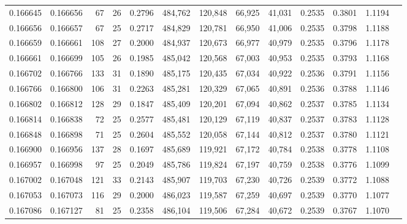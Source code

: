 \begin{tabular}{rrrrrrrrrrrrr}
0.166645 & 0.166656 &    67 &  26 &                                     0.2796 & 484,762 & 120,848 &  66,925 &  41,031 & 0.2535 & 0.3801 & 1.1194 \\
0.166656 & 0.166657 &    67 &  25 &                                     0.2717 & 484,829 & 120,781 &  66,950 &  41,006 & 0.2535 & 0.3798 & 1.1188 \\
0.166659 & 0.166661 &   108 &  27 &                                     0.2000 & 484,937 & 120,673 &  66,977 &  40,979 & 0.2535 & 0.3796 & 1.1178 \\
0.166661 & 0.166699 &   105 &  26 &                                     0.1985 & 485,042 & 120,568 &  67,003 &  40,953 & 0.2535 & 0.3793 & 1.1168 \\
0.166702 & 0.166766 &   133 &  31 &                                     0.1890 & 485,175 & 120,435 &  67,034 &  40,922 & 0.2536 & 0.3791 & 1.1156 \\
0.166766 & 0.166800 &   106 &  31 &                                     0.2263 & 485,281 & 120,329 &  67,065 &  40,891 & 0.2536 & 0.3788 & 1.1146 \\
0.166802 & 0.166812 &   128 &  29 &                                     0.1847 & 485,409 & 120,201 &  67,094 &  40,862 & 0.2537 & 0.3785 & 1.1134 \\
0.166814 & 0.166838 &    72 &  25 &                                     0.2577 & 485,481 & 120,129 &  67,119 &  40,837 & 0.2537 & 0.3783 & 1.1128 \\
0.166848 & 0.166898 &    71 &  25 &                                     0.2604 & 485,552 & 120,058 &  67,144 &  40,812 & 0.2537 & 0.3780 & 1.1121 \\
0.166900 & 0.166956 &   137 &  28 &                                     0.1697 & 485,689 & 119,921 &  67,172 &  40,784 & 0.2538 & 0.3778 & 1.1108 \\
0.166957 & 0.166998 &    97 &  25 &                                     0.2049 & 485,786 & 119,824 &  67,197 &  40,759 & 0.2538 & 0.3776 & 1.1099 \\
0.167002 & 0.167048 &   121 &  33 &                                     0.2143 & 485,907 & 119,703 &  67,230 &  40,726 & 0.2539 & 0.3772 & 1.1088 \\
0.167053 & 0.167073 &   116 &  29 &                                     0.2000 & 486,023 & 119,587 &  67,259 &  40,697 & 0.2539 & 0.3770 & 1.1077 \\
0.167086 & 0.167127 &    81 &  25 &                                     0.2358 & 486,104 & 119,506 &  67,284 &  40,672 & 0.2539 & 0.3767 & 1.1070 \\

\end{tabular}
